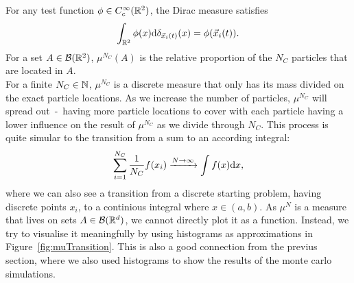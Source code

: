 For any test function \( \phi \in C_c^\infty(\mathbb{R}^2) \), the Dirac measure satisfies
\[
\int_{\mathbb{R}^2} \phi(x) \mathrm{d} \delta_{\vec{x}_i(t)}(x) = \phi(\vec{x}_i(t)).
\]
For a set $A \in \mathcal{B}(\mathbb{R}^2)$, $\mu^{N_C}(A)$ is the relative proportion of the $N_C$ particles that are located in $A$. \\
For a finite $N_C \in \mathbb{N}$, $\mu^{N_C}$ is a discrete measure that only has its mass divided on the exact particle locations. 
As we increase the number of particles, $\mu^{N_C}$ will spread out \,-\, having more particle locations to cover with each particle having a lower influence on the result of $\mu^{N_C}$ as we divide through $N_C$.
This process is quite simular to the transition from a sum to an according integral:
\[ \sum\limits_{i=1}^{N_C} \frac{1}{N_C} f(x_i) \xrightarrow{N \to \infty} \int f(x) \mathrm{d} x,  \]
where we can also see a transition from a discrete starting problem, having discrete points ${x_i}$, to a continious integral where $x \in (a,b)$. 
As $\mu^N$ is a measure that lives on sets $A \in \mathcal{B}(\mathbb{R}^d)$, we cannot directly plot it as a function. 
Instead, we try to visualise it meaningfully by using histograms as approximations in Figure~\ref{fig:muTransition}.
This is also a good connection from the previus section, where we also used histograms to show the results of the monte carlo simulations. 

